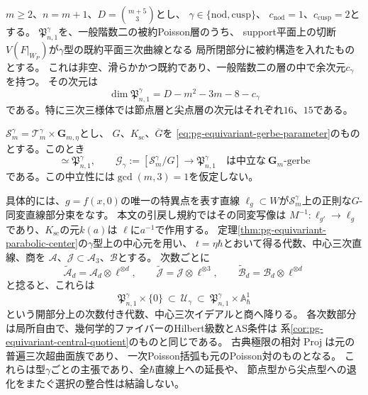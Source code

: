 \begin{proposition}[節点・尖点層の中心商と特異点直線による降下]
\label{prop:pg-equivariant-singular-strata}
$m\ge2$、$n=m+1$、$D=\binom{m+5}{3}$とし、
$\gamma\in\{\mathrm{nod},\mathrm{cusp}\}$、
$c_{\mathrm{nod}}=1$、$c_{\mathrm{cusp}}=2$とする。
$\mathfrak P_{n,1}^{\gamma}$を、一般階数二の被約Poisson層のうち、
support平面上の切断$V(F|_{W_P})$が$\gamma$型の既約平面三次曲線となる
局所閉部分に被約構造を入れたものとする。
これは非空、滑らかかつ既約であり、一般階数二の層の中で余次元$c_\gamma$を持つ。
その次元は
\begin{equation}
 \dim\mathfrak P_{n,1}^{\gamma}
 =D-m^2-3m-8-c_\gamma
 \label{eq:pg-equivariant-singular-stratum-dimension}
\end{equation}
である。特に三次三様体では節点層と尖点層の次元はそれぞれ$16$、$15$である。

$\mathscr S_m^\gamma=\mathcal T_m^\gamma\times\mathbf G_{m,\eta}$とし、
$G$、$K_{\mathrm{sc}}$、$\overline G$を
\eqref{eq:pg-equivariant-gerbe-parameter}のものとする。このとき
\begin{equation}
 [\mathscr S_m^\gamma/\overline G]\simeq\mathfrak P_{n,1}^{\gamma},
 \qquad
 \mathcal G_\gamma:=[\mathscr S_m^\gamma/G]
 \longrightarrow\mathfrak P_{n,1}^{\gamma}
 \quad\text{は中立な}\ \mathbf G_m\text{-gerbe}
 \label{eq:pg-equivariant-singular-gerbe}
\end{equation}
である。この中立性には$\gcd(m,3)=1$を仮定しない。

具体的には、$g=f(x,0)$の唯一の特異点を表す直線
$\ell_g\subset W$が$\mathscr S_m^\gamma$上の正則な$G$-同変直線部分束をなす。
本文の引戻し規約ではその同変写像は
$M^{-1}:\ell_{g'}\to\ell_g$であり、$K_{\mathrm{sc}}$の元$k(a)$は
$\ell$に$a^{-1}$で作用する。
定理\ref{thm:pg-equivariant-parabolic-center}の$\gamma$型上の中心元を用い、
$t=\eta\hbar$とおいて得る代数、中心三次直線、商を
$\mathcal A$、$\mathcal J\subset\mathcal A_3$、$\mathcal B$とする。
次数ごとに
\begin{equation}
 \widetilde{\mathcal A}_d=\mathcal A_d\otimes\ell^{\otimes d},
 \qquad
 \widetilde{\mathcal J}=\mathcal J\otimes\ell^{\otimes3},
 \qquad
 \widetilde{\mathcal B}_d=\mathcal B_d\otimes\ell^{\otimes d}
 \label{eq:pg-equivariant-singular-line-twist}
\end{equation}
と捻ると、これらは
\begin{equation}
 \mathfrak P_{n,1}^{\gamma}\times\{0\}
 \ \subset\ \mathcal U_\gamma
 \ \subset\ \mathfrak P_{n,1}^{\gamma}\times\mathbb A^1_\hbar
 \label{eq:pg-equivariant-singular-descended-base}
\end{equation}
という開部分上の次数付き代数、中心三次イデアルと商へ降りる。
各次数部分は局所自由で、幾何学的ファイバーのHilbert級数とAS条件は
系\ref{cor:pg-equivariant-central-quotient}のものと同じである。
古典極限の相対$\operatorname{Proj}$は元の普遍三次超曲面族であり、
一次Poisson括弧も元のPoisson対のものとなる。
これらは型$\gamma$ごとの主張であり、全$\hbar$直線上への延長や、
節点型から尖点型への退化をまたぐ選択の整合性は結論しない。
\end{proposition}
